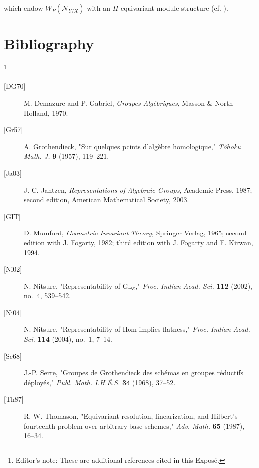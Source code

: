 which endow \(W_P(\mathcal N_{Y/X})\) with an \(H\)-equivariant module
structure (cf. ).

\section*{Bibliography}
\footnote{Editor's note: These are additional references cited in this
Expos\'e.}

\begin{description}
\item[{[DG70]}] M. Demazure and P. Gabriel,
  \emph{Groupes Alg\'ebriques}, Masson \& North-Holland, 1970.
\item[{[Gr57]}] A. Grothendieck,
  "Sur quelques points d'alg\`ebre homologique,"
  \emph{T\^ohoku Math. J.} \textbf{9} (1957), 119--221.
\item[{[Ja03]}] J. C. Jantzen,
  \emph{Representations of Algebraic Groups}, Academic Press, 1987;
  second edition, American Mathematical Society, 2003.
\item[{[GIT]}] D. Mumford,
  \emph{Geometric Invariant Theory}, Springer-Verlag, 1965;
  second edition with J. Fogarty, 1982; third edition with J. Fogarty
  and F. Kirwan, 1994.
\item[{[Ni02]}] N. Nitsure,
  "Representability of \(\mathrm{GL}_{\mathcal E}\),"
  \emph{Proc. Indian Acad. Sci.} \textbf{112} (2002), no.~4, 539--542.
\item[{[Ni04]}] N. Nitsure,
  "Representability of Hom implies flatness,"
  \emph{Proc. Indian Acad. Sci.} \textbf{114} (2004), no.~1, 7--14.
\item[{[Se68]}] J.-P. Serre,
  "Groupes de Grothendieck des sch\'emas en groupes r\'eductifs
  d\'eploy\'es,"
  \emph{Publ. Math. I.H.\'E.S.} \textbf{34} (1968), 37--52.
\item[{[Th87]}] R. W. Thomason,
  "Equivariant resolution, linearization, and Hilbert's fourteenth
  problem over arbitrary base schemes,"
  \emph{Adv. Math.} \textbf{65} (1987), 16--34.
\end{description}

